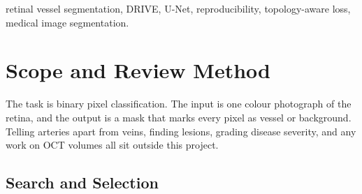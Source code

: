 \documentclass[conference]{IEEEtran}
\begin{document}
\maketitle

\begin{abstract}
This review studies ten papers published from 2021 to 2026 on marking blood
vessel pixels in retinal fundus photographs. We compare their network designs,
training schemes, metrics, model sizes and, most importantly for us, whether
their code can actually be run. Reported $F_1$ scores sit between
\textbf{82.06\%} and \textbf{86.44\%}, but those numbers cannot be lined up
directly, because the papers mask, threshold and split their data differently.
Three gaps stand out: four of the ten share no code, progress has slowed to
about four points of $F_1$ in five years, and every method is trained pixel by
pixel even though a vessel tree is only useful when it stays joined up. We
select \textbf{SGL} (MICCAI 2021) as the base paper, because its repository
already holds the DRIVE images, the labels and the trained weights, and because
its loss can be swapped from the command line. After reproducing its baseline
we will test one controlled change: replacing the pixel-wise loss with the
centre-line clDice loss. No clinical claim is made in this work.
\end{abstract}

\begin{IEEEkeywords}
retinal vessel segmentation, DRIVE, U-Net, reproducibility, topology-aware
loss, medical image segmentation.
\end{IEEEkeywords}

\section{Scope and Review Method}

The task is binary pixel classification. The input is one colour photograph of
the retina, and the output is a mask that marks every pixel as vessel or
background. Telling arteries apart from veins, finding lesions, grading disease
severity, and any work on OCT volumes all sit outside this project.

\subsection{Search and Selection}
\end{document}
